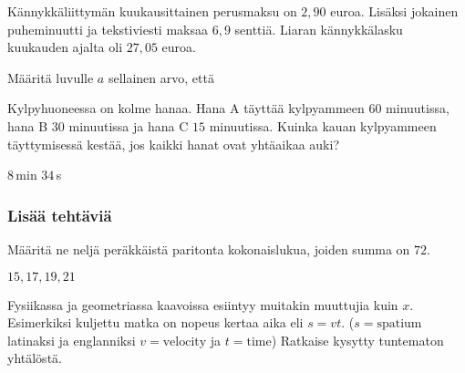 \begin{tehtavasivu}
\begin{tehtava}
Kännykkäliittymän kuukausittainen perusmaksu on $2,90$ euroa. Lisäksi jokainen puheminuutti ja tekstiviesti maksaa $6,9$ senttiä. Liaran kännykkälasku kuukauden ajalta oli $27,05$ euroa.

	\begin{vastaus}
	\end{vastaus}
\end{tehtava}

\begin{tehtava}
Määritä luvulle $a$ sellainen arvo, että
\begin{vastaus}
\end{vastaus}
\end{tehtava}

\begin{tehtava} %
Kylpyhuoneessa on kolme hanaa. Hana A täyttää kylpyammeen $60$ minuutissa, hana B $30$ minuutissa ja hana C $15$ minuutissa. Kuinka kauan kylpyammeen täyttymisessä kestää, jos kaikki hanat ovat yhtäaikaa auki?
	\begin{vastaus}
$8$\,min $34$\,s
	\end{vastaus}
\end{tehtava}

\subsubsection*{Lisää tehtäviä}

\begin{tehtava}
Määritä ne neljä peräkkäistä paritonta kokonaislukua, joiden summa on $72$.
	\begin{vastaus}
	 $15, 17, 19, 21$
	\end{vastaus}
\end{tehtava}

\begin{tehtava}
Fysiikassa ja geometriassa kaavoissa esiintyy muitakin muuttujia kuin $x$. Esimerkiksi kuljettu matka on nopeus kertaa aika eli $s=vt$. ($s= \text{spatium}$ latinaksi ja englanniksi $v= \text{velocity}$ ja $t= \text{time}$) Ratkaise kysytty tuntematon yhtälöstä.


\end{tehtava}
\end{tehtavasivu}
